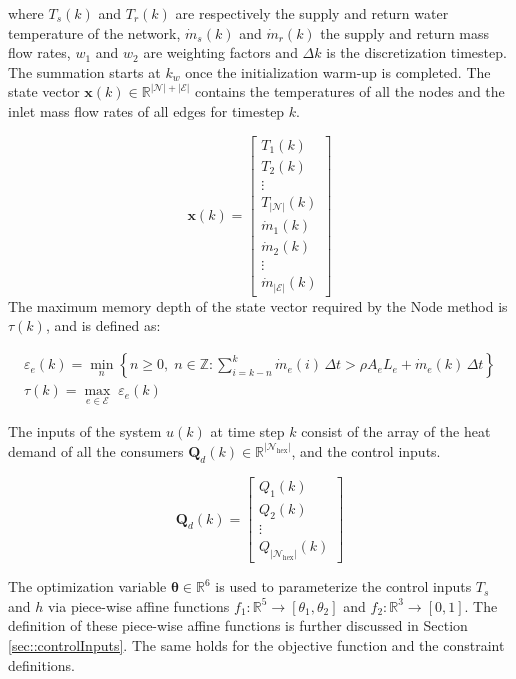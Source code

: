 where $T_s(k)$ and $T_r(k)$ are respectively the supply and return water temperature of the network, $\dot{m}_s(k)$ and $\dot{m}_r(k)$ the supply and return mass flow rates, $w_1$ and $w_2$ are weighting factors and $\Delta k$ is the discretization timestep. The summation starts at $k_w$ once the initialization warm-up is completed. The state vector $\boldsymbol{x}(k) \in \mathbb{R}^{|\mathcal{N}| + |\mathcal{E}|} $ contains the temperatures of all the nodes and the inlet mass flow rates of all edges for timestep $k$.

\[
\boldsymbol{x}(k) =
\left[
\begin{array}{c}
T_{1}(k) \\
T_{2}(k) \\
\vdots \\
T_{|\mathcal{N}|}(k) \\
\dot{m}_1(k) \\
\dot{m}_2(k) \\
\vdots \\
\dot{m}_{|\mathcal{E}|}(k)
\end{array}
\right]
\]
The maximum memory depth of the state vector required by the Node method is $\tau(k)$, and is defined as:

\begin{equation}
    \begin{gathered}
        \varepsilon_{e}(k) = \min_{n} \left\{ n \geq 0,\; n \in \mathbb{Z} : \sum_{i=k-n}^{k} \dot{m}_e(i)\,\Delta t > \rho A_e L_e + \dot{m}_e(k)\,\Delta t \right\} \\[6pt]
        \tau(k) = \max_{e \in \mathcal{E}} \; \varepsilon_e(k)
    \end{gathered}
    \label{eq::gammadelay_min}
\end{equation}

The inputs of the system $u(k)$ at time step $k$ consist of the array of the heat demand of all the consumers $\boldsymbol{Q}_d(k) \in \mathbb{R}^{|\mathcal{N}_{\text{hex}}|}$, and the control inputs. 

\[
\boldsymbol{Q}_d(k) =
\left[
\begin{array}{c}
Q_{1}(k) \\
Q_{2}(k) \\
\vdots \\
Q_{|\mathcal{N}_{\text{hex}}|}(k)
\end{array}
\right]
\]

The optimization variable $\boldsymbol{\theta} \in \mathbb{R}^6$ is used to parameterize the control inputs $T_s$ and $h$ via piece-wise affine functions $f_1: \mathbb{R}^5 \rightarrow [\theta_1,\theta_2]$ and $f_{2}: \mathbb{R}^3 \rightarrow [0,1]$. The definition of these piece-wise affine functions is further discussed in Section \ref{sec::controlInputs}. The same holds for the objective function and the constraint definitions.

